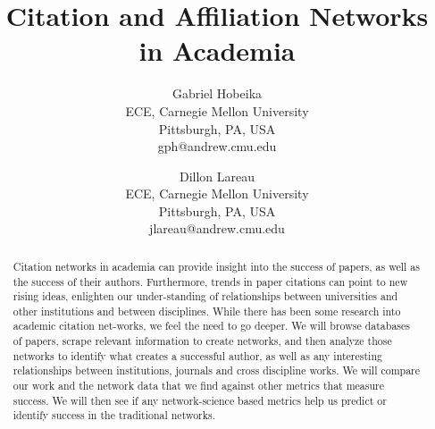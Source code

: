 \documentclass[times, 10pt,twocolumn]{article}
\begin{document}
\title{Citation and Affiliation Networks in Academia }

\author{Gabriel Hobeika\\
ECE, Carnegie Mellon University\\ Pittsburgh, PA, USA\\
gph@andrew.cmu.edu\\
\and
Dillon Lareau\\
ECE, Carnegie Mellon University\\ Pittsburgh, PA, USA\\
jlareau@andrew.cmu.edu\\
}

\maketitle
\thispagestyle{empty}

\begin{abstract}
Citation networks in academia can provide insight into the success of papers, as well as the success of their authors. Furthermore, trends in paper citations can point to new rising ideas, enlighten our under-standing of relationships between universities and other institutions and between disciplines. While there has been some research into academic citation net-works, we feel the need to go deeper. We will browse databases of papers, scrape relevant information to create networks, and then analyze those networks to identify what creates a successful author, as well as any interesting relationships between institutions, journals and cross discipline works. We will compare our work and the network data that we find against other metrics that measure success. We will then see if any network-science based metrics help us predict or identify success in the traditional networks.  
\end{abstract}
\end{document}
